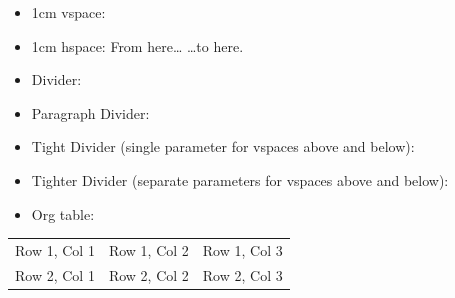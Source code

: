 \documentclass[10pt,letterpaper,ragged2e,withhyper]{altacv}
\begin{document}
\label{sec:orgd56bf09}
\begin{itemize}
\item 1cm vspace:
\end{itemize}

\vspace{1cm}

\begin{itemize}
\item 1cm hspace: From here\ldots{} \hspace{1cm} \ldots{}to here.
\end{itemize}


\label{sec:org82b3698}
\begin{itemize}
\item Divider:
\end{itemize}
\divider

\begin{itemize}
\item Paragraph Divider:
\end{itemize}
\par\divider

\begin{itemize}
\item Tight Divider (single parameter for vspaces above and below):
\end{itemize}
\vspace{-1ex}\divider\vspace{-1ex}

\begin{itemize}
\item Tighter Divider (separate parameters for vspaces above and below):
\end{itemize}
\vspace{-2ex}\divider\vspace{1ex}


\label{sec:org61b3fe8}
\begin{itemize}
\item Org table:
\end{itemize}

\begin{center}
\begin{tabular}{lll}
\hline
Row 1, Col 1 & Row 1, Col 2 & Row 1, Col 3\\[0pt]
Row 2, Col 1 & Row 2, Col 2 & Row 2, Col 3\\[0pt]
\hline
\end{tabular}
\end{center}
\end{document}
